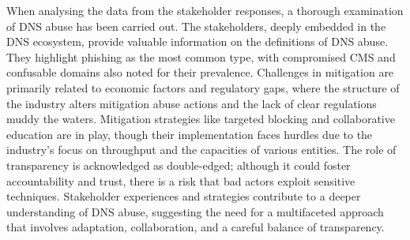 When analysing the data from the stakeholder responses, a thorough examination of DNS abuse has been carried out. The stakeholders, deeply embedded in the DNS ecosystem, provide valuable information on the definitions of DNS abuse. They highlight phishing as the most common type, with compromised CMS and confusable domains also noted for their prevalence. Challenges in mitigation are primarily related to economic factors and regulatory gaps, where the structure of the industry alters mitigation abuse actions and the lack of clear regulations muddy the waters. Mitigation strategies like targeted blocking and collaborative education are in play, though their implementation faces hurdles due to the industry's focus on throughput and the capacities of various entities. The role of transparency is acknowledged as double-edged; although it could foster accountability and trust, there is a risk that bad actors exploit sensitive techniques. Stakeholder experiences and strategies contribute to a deeper understanding of DNS abuse, suggesting the need for a multifaceted approach that involves adaptation, collaboration, and a careful balance of transparency.

